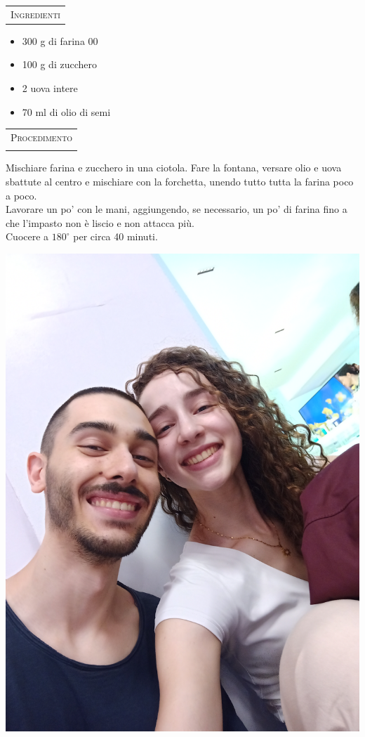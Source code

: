 \noindent
\begin{minipage}[t][\textheight][t]{\textwidth}


    \begin{minipage}[t]{0.3\textwidth}
        \vspace{2.5cm}

        \begin{tabularx}{\linewidth}{X}
        {\Large \textsc{Ingredienti}} \\ %
        \end{tabularx}
        \begin{itemize}[label={}, left=10pt]
            \item 300 g di farina 00
            \item 100 g di zucchero
            \item 2 uova intere
            \item 70 ml di olio di semi
        \end{itemize}

    \end{minipage}%
    \hfill
    \begin{minipage}[t]{0.65\textwidth}
        \begin{tabularx}{\linewidth}{X}
        \\
        {\Large \textsc{Procedimento}} \\ \\%
        \end{tabularx}
		Mischiare farina e zucchero in una ciotola. Fare la fontana, versare olio e uova sbattute al centro e mischiare con la forchetta, unendo tutto tutta la farina poco a poco.\\
		Lavorare un po' con le mani, aggiungendo, se necessario, un po' di farina fino a che l'impasto non è liscio e non attacca più.\\
		Cuocere a $180^{\circ}$ per circa 40 minuti.
        
     	\includegraphics[valign=t, width=0.5\linewidth]{images/dolci/test}
    \end{minipage}
    

\end{minipage}
